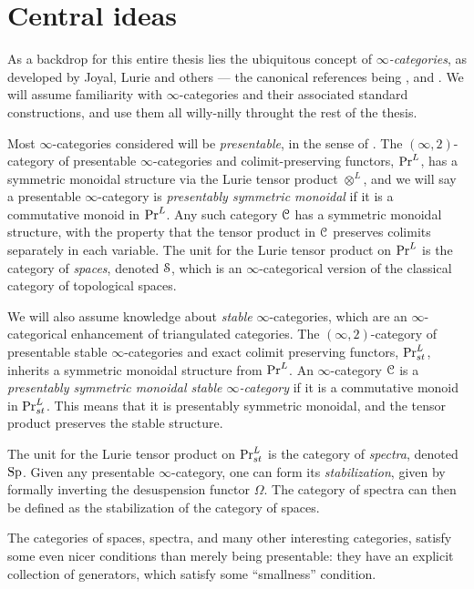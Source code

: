
\section{Central ideas}
\label{ch0:sec:Central-ideas}

As a backdrop for this entire thesis lies the ubiquitous concept of \emph{$\infty$-categories}, as developed by Joyal, Lurie and others --- the canonical references being \cite{joyal_02}, \cite{lurie_09} and \cite{Lurie_HA}. We will assume familiarity with $\infty$-categories and their associated standard constructions, and use them all willy-nilly throught the rest of the thesis. 

Most $\infty$-categories considered will be \emph{presentable}, in the sense of \cite[Chapter 5]{lurie_09}. The $(\infty, 2)$-category of presentable $\infty$-categories and colimit-preserving functors, $\mathrm{Pr}^L$, has a symmetric monoidal structure via the Lurie tensor product $\otimes^L$, and we will say a presentable $\infty$-category is \emph{presentably symmetric monoidal} if it is a commutative monoid in $\mathrm{Pr}^L$. Any such category $\EuScript{C}$ has a symmetric monoidal structure, with the property that the tensor product in $\EuScript{C}$ preserves colimits separately in each variable. The unit for the Lurie tensor product on $\mathrm{Pr}^L$ is the category of \emph{spaces}, denoted $\EuScript{S}$, which is an $\infty$-categorical version of the classical category of topological spaces. 

We will also assume knowledge about \emph{stable} $\infty$-categories, which are an $\infty$-categorical enhancement of triangulated categories. The $(\infty, 2)$-category of presentable stable $\infty$-categories and exact colimit preserving functors, $\mathrm{Pr}_{st}^L$, inherits a symmetric monoidal structure from $\mathrm{Pr}^L$. An $\infty$-category $\EuScript{C}$ is a \emph{presentably symmetric monoidal stable $\infty$-category} if it is a commutative monoid in $\mathrm{Pr}_{st}^L$. This means that it is presentably symmetric monoidal, and the tensor product preserves the stable structure. 

The unit for the Lurie tensor product on $\mathrm{Pr}_{st}^L$ is the category of \emph{spectra}, denoted $\mathrm{Sp}$. Given any presentable $\infty$-category, one can form its \emph{stabilization}, given by formally inverting the desuspension functor $\Omega$. The category of spectra can then be defined as the stabilization of the category of spaces. 

The categories of spaces, spectra, and many other interesting categories, satisfy some even nicer conditions than merely being presentable: they have an explicit collection of generators, which satisfy some ``smallness'' condition. 

